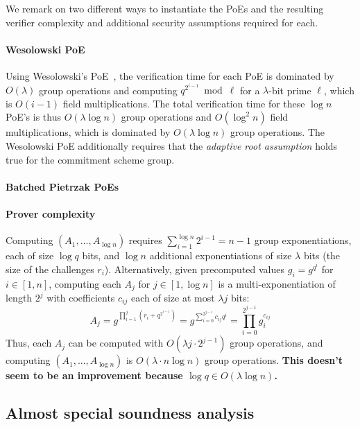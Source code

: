 We remark on two different ways to instantiate the PoEs and the resulting verifier complexity and additional security assumptions required for each. 

\paragraph{Wesolowski PoE} Using Wesolowski's PoE~\cite{EC:Wesolowski19}, the verification time for each PoE is dominated by $O(\lambda)$ group operations and computing $q^{2^{i-1}} \bmod \ell$ for a $\lambda$-bit prime $\ell$, which is $O(i-1)$ field multiplications. The total verification time for these $\log n$ PoE's is thus $O(\lambda \log n)$ group operations and $O(\log^2 n )$ field multiplications, which is dominated by $O(\lambda \log n)$ group operations. The Wesolowski PoE additionally requires that the \emph{adaptive root assumption} holds true for the commitment scheme group. 

\paragraph{Batched Pietrzak PoEs} 

\paragraph{Prover complexity} Computing $(A_1,...,A_{\log n})$ requires $\sum_{i = 1}^{\log n} 2^{i-1} = n -1$ group exponentiations, each of size $\log q$ bits, and $\log n$ additional exponentiations of size $\lambda$ bits (the size of the challenges $r_i$). Alternatively, given precomputed values $g_i = g^{q^i}$ for $i \in [1, n]$, computing each $A_j$ for $j \in [1, \log n]$ is a multi-exponentiation of length $2^j$ with coefficients $c_{ij}$ each of size at most $\lambda j$ bits: 
$$A_j = g^{\prod_{i = 1}^j (r_i + q^{2^{i-1}})} = g^{\sum_{i = 0}^{2^{j-1}} c_{ij} q^i} = \prod_{i = 0}^{2^{j-1}} g_i^{c_{ij}} $$ 
Thus, each $A_j$ can be computed with $O(\lambda j \cdot  2^{j-1})$ group operations, and computing $(A_1,...,A_{\log n})$ is $O(\lambda \cdot n \log n)$ group operations. \textbf{This doesn't seem to be an improvement because $\log q \in O(\lambda \log n)$.} 


\subsection{Almost special soundness analysis} 

